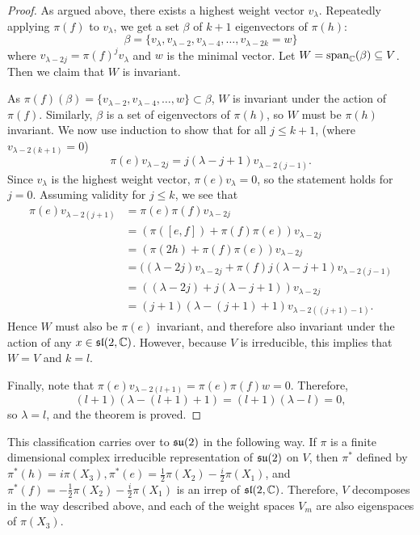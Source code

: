 \documentclass[a4paper]{article}
\begin{document}
\begin{proof}
    As argued above, there exists a highest weight vector $v_{\lambda}$. Repeatedly applying $\pi(f)$ to $v_{\lambda}$, we get a set $\beta$ of $k+1$ eigenvectors of $\pi(h)$:
    $$\beta = \{v_{\lambda}, v_{\lambda -2}, v_{\lambda -4}, \hdots, v_{\lambda - 2k} = w\}$$ 
    where $v_{\lambda -2j} = \pi(f)^j v_{\lambda}$ and $w$ is the minimal vector. Let $W = \text{span}_{\mathbb{C}}(\beta) \subseteq V$. Then we claim that $W$ is invariant.

    As $\pi(f)(\beta) = \{v_{\lambda -2}, v_{\lambda -4}, \hdots, w\} \subset \beta$, $W$ is invariant under the action of $\pi(f)$. Similarly, $\beta$ is a set of eigenvectors of $\pi(h)$, so $W$ must be $\pi(h)$ invariant. We now use induction to show that for all $j \leq k + 1$, (where $v_{\lambda - 2(k+1)} = 0$)
    $$\pi(e)v_{\lambda - 2j} = j(\lambda-j+1)v_{\lambda - 2(j-1)}.$$ 
    Since $v_{\lambda}$ is the highest weight vector, $\pi(e)v_{\lambda} = 0$, so the statement holds for $j=0$. Assuming validity for $j \leq k$, we see that 
    \begin{align*}
        \pi(e) v_{\lambda-2(j+1)} &= \pi(e) \pi(f) v_{\lambda-2 j} \\
            &=(\pi([e, f])+\pi(f) \pi(e)) v_{\lambda-2 j} \\
            &=(\pi(2 h)+\pi(f) \pi(e)) v_{\lambda-2 j} \\
            &=((\lambda-2 j) v_{\lambda-2 j}+\pi(f) j(\lambda-j+1) v_{\lambda-2(j-1)}\\
            &=((\lambda-2 j)+j(\lambda-j+1)) v_{\lambda-2 j} \\
            &=(j+1)(\lambda-(j+1)+1) v_{\lambda-2((j+1)-1)}.
    \end{align*}
    Hence $W$ must also be $\pi(e)$ invariant, and therefore also invariant under the action of any $x \in \mathfrak{sl}(2, \mathbb{C})$. However, because $V$ is irreducible, this implies that $W=V$ and $k=l$.

    Finally, note that $\pi(e)v_{\lambda-2(l+1)} = \pi(e)\pi(f)w = 0$. Therefore, $$(l + 1)(\lambda-(l+1)+1) = (l + 1)(\lambda-l) = 0,$$
    so $\lambda = l$, and the theorem is proved.
\end{proof}

This classification carries over to $\mathfrak{su}(2)$ in the following way. If $\pi$ is a finite dimensional complex irreducible representation of $\mathfrak{su}(2)$ on $V$, then $\pi^*$ defined by $\pi^*({h}) = i\pi(X_3), \pi^*({e}) = \frac{1}{2}\pi(X_2) - \frac{i}{2}\pi(X_1)$, and $\pi^*({f}) = -\frac{1}{2}\pi(X_2) - \frac{i}{2}\pi(X_1)$ is an irrep of $\mathfrak{sl}(2, \mathbb{C})$. Therefore, $V$ decomposes in the way described above, and each of the weight spaces $V_m$ are also eigenspaces of $\pi(X_3)$.
\end{document}
